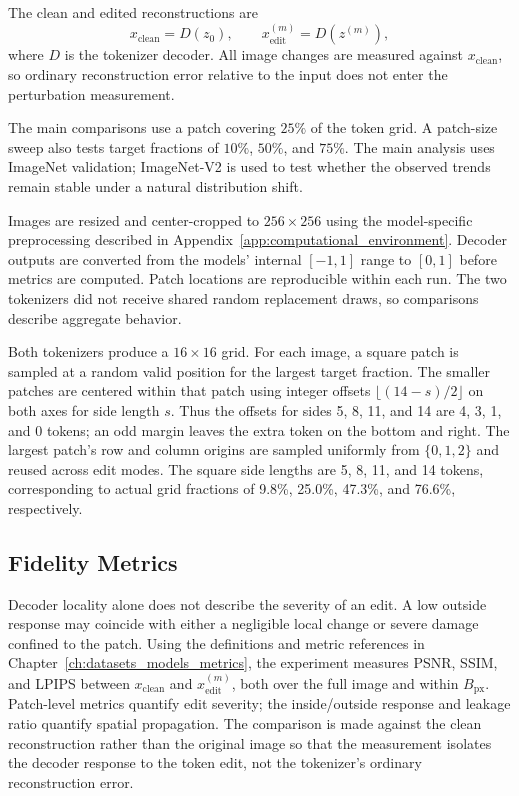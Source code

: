 The clean and edited reconstructions are
\begin{equation}
    x_{\mathrm{clean}} = D(z_0),
    \qquad
    x_{\mathrm{edit}}^{(m)} = D(z^{(m)}),
    \label{eq:rq4_clean_edited_decode}
\end{equation}
where $D$ is the tokenizer decoder. All image changes are measured against
$x_{\mathrm{clean}}$, so ordinary reconstruction error relative to the input
does not enter the perturbation measurement.

The main comparisons use a patch covering $25\%$ of the token grid. A
patch-size sweep also tests target fractions of $10\%$, $50\%$, and $75\%$.
The main analysis uses
ImageNet validation; ImageNet-V2 is used to test whether the observed trends
remain stable under a natural distribution shift.

Images are resized and center-cropped to $256\times256$ using the
model-specific preprocessing described in Appendix~\ref{app:computational_environment}.
Decoder outputs are converted from the models' internal $[-1,1]$ range to
$[0,1]$ before metrics are computed. Patch locations
are reproducible within each run. The two tokenizers did not receive shared
random replacement draws, so comparisons describe aggregate behavior.

Both tokenizers produce a $16 \times 16$ grid. For each image, a square patch
is sampled at a random valid position for the largest target fraction. The
smaller patches are centered within that patch using integer offsets
$\lfloor(14-s)/2\rfloor$ on both axes for side length $s$. Thus the offsets
for sides 5, 8, 11, and 14 are 4, 3, 1, and 0 tokens; an odd margin leaves
the extra token on the bottom and right. The largest patch's row and column
origins are sampled uniformly from $\{0,1,2\}$ and reused across edit modes.
The square side lengths are
5, 8, 11, and 14 tokens, corresponding to actual grid fractions of 9.8\%,
25.0\%, 47.3\%, and 76.6\%, respectively.

\subsection{Fidelity Metrics}
\label{subsec:rq4_fidelity_metrics}

Decoder locality alone does not describe the severity of an edit. A low
outside response may coincide with either a negligible local change or severe
damage confined to the patch. Using the definitions and metric references in
Chapter~\ref{ch:datasets_models_metrics}, the experiment measures PSNR, SSIM,
and LPIPS between $x_{\mathrm{clean}}$ and $x_{\mathrm{edit}}^{(m)}$, both over
the full image and within $B_{\mathrm{px}}$. Patch-level metrics quantify edit
severity; the inside/outside response and leakage ratio quantify spatial
propagation. The comparison is made against the clean reconstruction rather
than the original image so that the measurement isolates the decoder response
to the token edit, not the tokenizer's ordinary reconstruction error.

